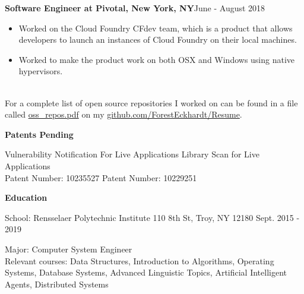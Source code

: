 \documentclass[10pt,a4papaer]{article}
\begin{document}
{\begin{itemize}[noitemsep, topsep=0pt]
			
		\end{itemize}
		
		{\noindent\textbf{Software Engineer at Pivotal, New York, NY}}{\hfill June - August 2018}
		\begin{itemize}[noitemsep, topsep=0pt]
			\item Worked on the Cloud Foundry CFdev team, which is a product that allows developers to launch an instances of Cloud Foundry on their local machines.
			\item Worked to make the product work on both OSX and Windows using native hypervisors.
		\end{itemize}
		{\noindent\\ For a complete list of open source repositories I worked on can be found in a file called \href{http://www.github.com/ForestEckhardt/Resume/blob/master/oss_repos.pdf}{ oss\_repos.pdf} on my \href{http://www.github.com/ForestEckhardt/Resume}{github.com/ForestEckhardt/Resume}}.\\
		
		
		\setlength{\leftskip}{0pt}
		
		{\noindent\textbf{Patents Pending}\vspace*{-20px}\\}
		
		\noindent\makebox[\linewidth]{\rule{\textwidth}{1.2pt}}
		
		\setlength{\leftskip}{15pt}
		
		\noindent Vulnerability Notification For Live Applications {\hfill Library Scan for Live Applications}\\
		Patent Number: 10235527 {\hfill Patent Number: 10229251\quad}\\
		
		\setlength{\leftskip}{0pt}
		
		{\noindent\textbf{Education}}\vspace*{-20px}\\
		
		\noindent\makebox[\linewidth]{\rule{\textwidth}{1.3pt}}
		
		{ School: Rensselaer Polytechnic Institute 110 8th St, Troy, NY 12180 {\hfill Sept. 2015 - 2019}}
		
		\setlength{\leftskip}{50pt}
		
		{\noindent Major: Computer System Engineer\\
			Relevant courses: Data Structures, Introduction to Algorithms, Operating Systems, Database Systems, Advanced Linguistic Topics, Artificial Intelligent Agents, Distributed Systems}\\
		
}
\end{document}
